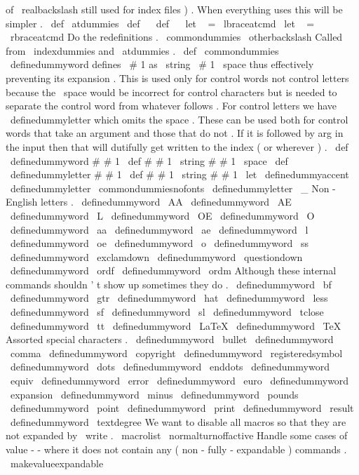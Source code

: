 {{of
%
\
realbackslash
still
used
for
index
files
)
.
When
everything
uses
%
this
will
be
simpler
.
%
\
def
\
atdummies
{
%
\
def
\
{
}
%
\
def
\
{
}
%
\
let
\
{
=
\
lbraceatcmd
\
let
\
}
=
\
rbraceatcmd
%
%
Do
the
redefinitions
.
\
commondummies
\
otherbackslash
}
%
Called
from
\
indexdummies
and
\
atdummies
.
%
\
def
\
commondummies
{
%
%
%
\
definedummyword
defines
\
#
1
as
\
string
\
#
1
\
space
thus
effectively
%
preventing
its
expansion
.
This
is
used
only
for
control
%
words
%
not
control
letters
because
the
\
space
would
be
incorrect
for
%
control
characters
but
is
needed
to
separate
the
control
word
%
from
whatever
follows
.
%
%
For
control
letters
we
have
\
definedummyletter
which
omits
the
%
space
.
%
%
These
can
be
used
both
for
control
words
that
take
an
argument
and
%
those
that
do
not
.
If
it
is
followed
by
{
arg
}
in
the
input
then
%
that
will
dutifully
get
written
to
the
index
(
or
wherever
)
.
%
\
def
\
definedummyword
#
#
1
{
\
def
#
#
1
{
\
string
#
#
1
\
space
}
}
%
\
def
\
definedummyletter
#
#
1
{
\
def
#
#
1
{
\
string
#
#
1
}
}
%
\
let
\
definedummyaccent
\
definedummyletter
%
\
commondummiesnofonts
%
\
definedummyletter
\
_
%
%
%
Non
-
English
letters
.
\
definedummyword
\
AA
\
definedummyword
\
AE
\
definedummyword
\
L
\
definedummyword
\
OE
\
definedummyword
\
O
\
definedummyword
\
aa
\
definedummyword
\
ae
\
definedummyword
\
l
\
definedummyword
\
oe
\
definedummyword
\
o
\
definedummyword
\
ss
\
definedummyword
\
exclamdown
\
definedummyword
\
questiondown
\
definedummyword
\
ordf
\
definedummyword
\
ordm
%
%
Although
these
internal
commands
shouldn
'
t
show
up
sometimes
they
do
.
\
definedummyword
\
bf
\
definedummyword
\
gtr
\
definedummyword
\
hat
\
definedummyword
\
less
\
definedummyword
\
sf
\
definedummyword
\
sl
\
definedummyword
\
tclose
\
definedummyword
\
tt
%
\
definedummyword
\
LaTeX
\
definedummyword
\
TeX
%
%
Assorted
special
characters
.
\
definedummyword
\
bullet
\
definedummyword
\
comma
\
definedummyword
\
copyright
\
definedummyword
\
registeredsymbol
\
definedummyword
\
dots
\
definedummyword
\
enddots
\
definedummyword
\
equiv
\
definedummyword
\
error
\
definedummyword
\
euro
\
definedummyword
\
expansion
\
definedummyword
\
minus
\
definedummyword
\
pounds
\
definedummyword
\
point
\
definedummyword
\
print
\
definedummyword
\
result
\
definedummyword
\
textdegree
%
%
We
want
to
disable
all
macros
so
that
they
are
not
expanded
by
\
write
.
\
macrolist
%
\
normalturnoffactive
%
%
Handle
some
cases
of
value
-
-
where
it
does
not
contain
any
%
(
non
-
fully
-
expandable
)
commands
.
\
makevalueexpandable
}
}}
